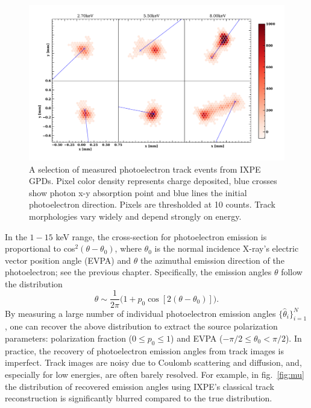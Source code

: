 \begin{figure}[t]
\centering
\includegraphics[scale=.5]{figures/fig1.pdf}
\caption{A selection of measured photoelectron track events from IXPE GPDs. Pixel color density represents charge deposited, blue crosses show photon x-y absorption point and blue lines the initial photoelectron direction. Pixels are thresholded at 10 counts. Track morphologies vary widely and depend strongly on energy.}
\label{fig:tracks}       %
\end{figure}

In the $1-15$ keV range, the cross-section for photoelectron emission is proportional to cos$^2(\theta - \theta_0)$, where $\theta_0$ is the normal incidence X-ray's electric vector position angle (EVPA) and $\theta$ the azimuthal emission direction of the photoelectron; see the previous chapter. 
Specifically, the emission angles $\theta$ follow the distribution 
\begin{equation}
    \theta \sim \frac{1}{2\pi} \big(1 + p_0\cos[2(\theta - \theta_0)] \big).
    \label{eqn:prob}
\end{equation}
By measuring a large number of individual photoelectron emission angles $\{\hat{\theta}_i\}_{i=1}^N$, one can recover the above distribution to extract the source polarization parameters: polarization fraction ($0 \leq p_0 \leq 1$) and EVPA ($-\pi/2 \leq \theta_0 < \pi/2$). In practice, the recovery of photoelectron emission angles from track images is imperfect. Track images are noisy due to Coulomb scattering and diffusion, and, especially for low energies, are often barely resolved. For example, in fig.~\ref{fig:mu} the distribution of recovered emission angles using IXPE's classical track reconstruction is significantly blurred compared to the true distribution.

